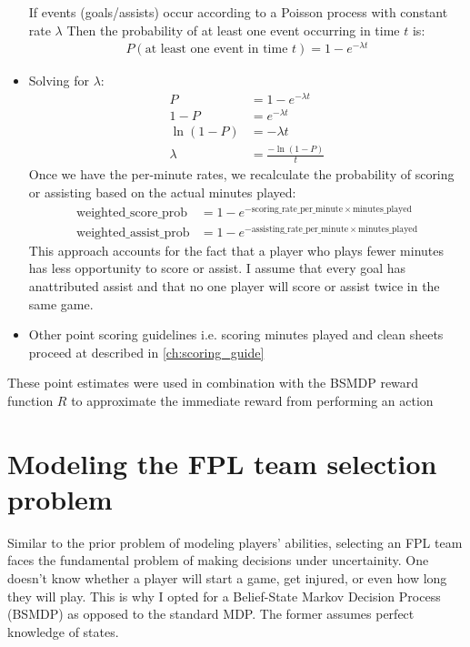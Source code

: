 \begin{itemize}
    If events (goals/assists) occur according to a Poisson process with constant rate $\lambda$ Then the probability of at least one event occurring in time $t$ is:
    \begin{align}
        P(\text{at least one event in time $t$}) = 1 - e^{-\lambda t}
    \end{align}
    \item Solving for $\lambda$:
    \begin{align}
        P &= 1 - e^{-\lambda t} \\
        1 - P &= e^{-\lambda t} \\
        \ln(1 - P) &= -\lambda t \\
        \lambda &= \frac{-\ln(1 - P)}{t}
    \end{align}
    Once we have the per-minute rates, we recalculate the probability of scoring or assisting based on the actual minutes played:
    \begin{align}
    \text{weighted\_score\_prob} &= 1 - e^{-\text{scoring\_rate\_per\_minute} \times \text{minutes\_played}} \\
    \text{weighted\_assist\_prob} &= 1 - e^{-\text{assisting\_rate\_per\_minute} \times \text{minutes\_played}}
    \end{align}
    This approach accounts for the fact that a player who plays fewer minutes has less opportunity to score or assist. I assume that every goal has anattributed assist and that no one player will score or assist twice in the same game.
    
    \item Other point scoring guidelines i.e. scoring minutes played and clean sheets proceed at described in \ref{ch:scoring_guide}
\end{itemize}
These point estimates were used in combination with the BSMDP reward function $R$ to approximate the immediate reward from performing an action

\section{Modeling the FPL team selection problem}
Similar to the prior problem of modeling players' abilities, selecting an FPL team faces the fundamental problem of making decisions under uncertainity. One doesn't know whether a player will start a game, get injured, or even how long they will play. This is why I opted for a Belief-State Markov Decision Process (BSMDP) as opposed to the standard MDP. The former assumes perfect knowledge of states.

